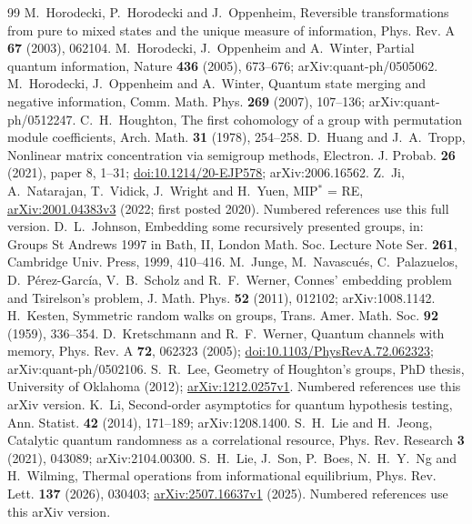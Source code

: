 \documentclass[11pt,a4paper]{article}
\theoremstyle{plain}
\theoremstyle{definition}
\theoremstyle{remark}
\begin{document}
\begin{thebibliography}{99}
 M.~Horodecki, P.~Horodecki and J.~Oppenheim, Reversible transformations from pure to mixed states and the unique measure of information, Phys. Rev. A \textbf{67} (2003), 062104.
 M.~Horodecki, J.~Oppenheim and A.~Winter, Partial quantum information, Nature \textbf{436} (2005), 673--676; arXiv:quant-ph/0505062.
 M.~Horodecki, J.~Oppenheim and A.~Winter, Quantum state merging and negative information, Comm. Math. Phys. \textbf{269} (2007), 107--136; arXiv:quant-ph/0512247.
 C.~H.~Houghton, The first cohomology of a group with permutation module coefficients, Arch. Math. \textbf{31} (1978), 254--258.
 D.~Huang and J.~A.~Tropp, Nonlinear matrix concentration via semigroup methods, Electron. J. Probab. \textbf{26} (2021), paper 8, 1--31; \href{https://doi.org/10.1214/20-EJP578}{doi:10.1214/20-EJP578}; arXiv:2006.16562.
 Z.~Ji, A.~Natarajan, T.~Vidick, J.~Wright and H.~Yuen, MIP$^*$ = RE, \href{https://arxiv.org/abs/2001.04383v3}{arXiv:2001.04383v3} (2022; first posted 2020). Numbered references use this full version.
 D.~L.~Johnson, Embedding some recursively presented groups, in: Groups St Andrews 1997 in Bath, II, London Math. Soc. Lecture Note Ser. \textbf{261}, Cambridge Univ. Press, 1999, 410--416.
 M.~Junge, M.~Navascu\'es, C.~Palazuelos, D.~P\'erez-Garc\'ia, V.~B.~Scholz and R.~F.~Werner, Connes' embedding problem and Tsirelson's problem, J. Math. Phys. \textbf{52} (2011), 012102; arXiv:1008.1142.
 H.~Kesten, Symmetric random walks on groups, Trans. Amer. Math. Soc. \textbf{92} (1959), 336--354.
 D.~Kretschmann and R.~F.~Werner, Quantum channels with memory, Phys. Rev. A \textbf{72}, 062323 (2005); \href{https://doi.org/10.1103/PhysRevA.72.062323}{doi:10.1103/PhysRevA.72.062323}; arXiv:quant-ph/0502106.
 S.~R.~Lee, Geometry of Houghton's groups, PhD thesis, University of Oklahoma (2012); \href{https://arxiv.org/abs/1212.0257v1}{arXiv:1212.0257v1}. Numbered references use this arXiv version.
 K.~Li, Second-order asymptotics for quantum hypothesis testing, Ann. Statist. \textbf{42} (2014), 171--189; arXiv:1208.1400.
 S.~H.~Lie and H.~Jeong, Catalytic quantum randomness as a correlational resource, Phys. Rev. Research \textbf{3} (2021), 043089; arXiv:2104.00300.
 S.~H.~Lie, J.~Son, P.~Boes, N.~H.~Y.~Ng and H.~Wilming, Thermal operations from informational equilibrium, Phys. Rev. Lett. \textbf{137} (2026), 030403; \href{https://arxiv.org/abs/2507.16637v1}{arXiv:2507.16637v1} (2025). Numbered references use this arXiv version.

\end{thebibliography}
\end{document}
